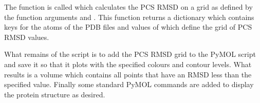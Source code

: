 \documentclass[a4paper,10pt,english,openany,oneside]{sphinxmanual}
\begin{document}
\sphinxAtStartPar
The function {\hyperref[\detokenize{reference/generated/paramagpy.fit.gridsearch_fit_atom_from_pcs:paramagpy.fit.gridsearch_fit_atom_from_pcs}]{}} is called which calculates the PCS RMSD on a grid as defined by the function arguments  and . This function returns a dictionary which contains keys for the atoms of the PDB files and values of {\hyperref[\detokenize{reference/generated/paramagpy.fit.DensityMap:paramagpy.fit.DensityMap}]{}} which define the grid of PCS RMSD values.

\sphinxAtStartPar
What remains of the script is to add the PCS RMSD grid to the PyMOL script and save it so that it plots with the specified colours and contour levels. What results is a volume which contains all points that have an RMSD less than the specified  value. Finally some standard PyMOL commands are added to display the protein structure as desired.
\end{document}
